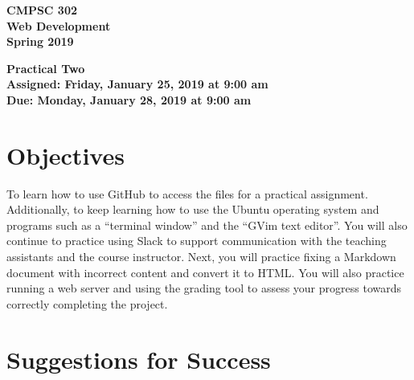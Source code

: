 \documentclass[11pt]{article}
\newcommand{\assignmentduedate}{January 28}
\newcommand{\assignmentassignedate}{January 25}
\newcommand{\assignmentnumber}{Two}
\newcommand{\labyear}{2019}
\newcommand{\labdueday}{Monday}
\newcommand{\labassignday}{Friday}
\newcommand{\labtime}{9:00 am}
\newcommand{\assigneddate}{Assigned: \labassignday, \assignmentassignedate, \labyear{} at \labtime{}}
\newcommand{\duedate}{Due: \labdueday, \assignmentduedate, \labyear{} at \labtime{}}
\newcommand{\labtitle}[1]
{
  \begin{center}
    \begin{center}
      \bf
      CMPSC 302\\Web Development\\
      Spring 2019\\
      \medskip
    \end{center}
    \bf
    #1
  \end{center}
}
\begin{document}
\thispagestyle{empty}

\labtitle{Practical \assignmentnumber{} \\ \assigneddate{} \\ \duedate{}}

\section*{Objectives}

To learn how to use GitHub to access the files for a practical assignment.
Additionally, to keep learning how to use the Ubuntu operating system and
programs such as a ``terminal window'' and the ``GVim text editor''. You will
also continue to practice using Slack to support communication with the teaching
assistants and the course instructor. Next, you will practice fixing a Markdown
document with incorrect content and convert it to HTML. You will also practice
running a web server and using the grading tool to assess your progress towards
correctly completing the project.

\section*{Suggestions for Success}
\end{document}
